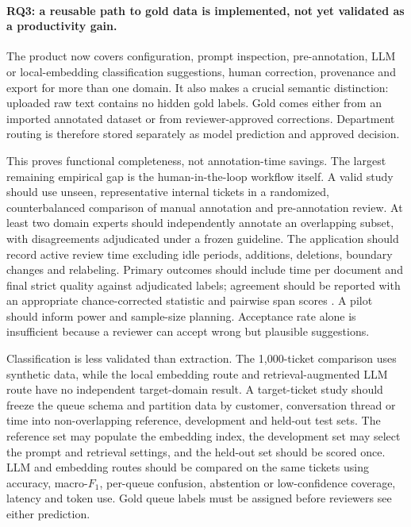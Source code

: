 \paragraph{RQ3: a reusable path to gold data is implemented, not yet validated
as a productivity gain.}
The product now covers configuration, prompt inspection, pre-annotation,
LLM or local-embedding classification suggestions, human correction,
provenance and export for more than one domain. It also makes a crucial semantic
distinction: uploaded raw text
contains no hidden gold labels. Gold comes either from an imported annotated
dataset or from reviewer-approved corrections. Department routing is therefore
stored separately as model prediction and approved decision.

This proves functional completeness, not annotation-time savings. The largest
remaining empirical gap is the human-in-the-loop workflow itself. A valid study
should use unseen, representative internal tickets in a randomized,
counterbalanced comparison of manual annotation and pre-annotation review.
At least two domain experts should independently annotate an overlapping subset,
with disagreements adjudicated under a frozen guideline. The application should
record active review time excluding idle periods, additions, deletions, boundary
changes and relabeling. Primary outcomes should include time per document and
final strict quality against adjudicated labels; agreement should be reported
with an appropriate chance-corrected statistic and pairwise span scores
\citep{artstein2008intercoder}. A pilot should inform power and sample-size
planning. Acceptance rate alone is insufficient because a reviewer can accept
wrong but plausible suggestions.

Classification is less validated than extraction. The 1{,}000-ticket comparison
uses synthetic data, while the local embedding route and retrieval-augmented LLM
route have no independent target-domain result. A target-ticket study should
freeze the queue schema and partition data by customer, conversation thread or
time into non-overlapping reference, development and held-out test sets. The
reference set may populate the embedding index, the development set may select
the prompt and retrieval settings, and the held-out set should be scored once.
LLM and embedding routes should be compared on the same tickets using accuracy,
macro-$F_1$, per-queue confusion, abstention or low-confidence coverage, latency
and token use. Gold queue labels must be assigned before reviewers see either
prediction.

